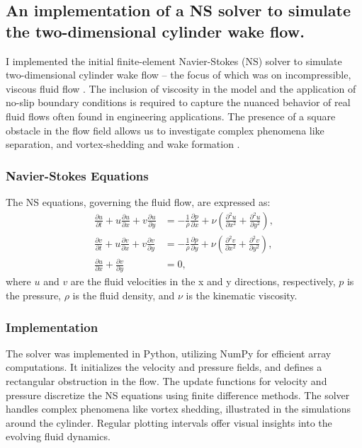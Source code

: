 \subsection{An implementation of a NS solver to simulate the two-dimensional cylinder wake flow.}

I implemented the initial finite-element Navier-Stokes (NS) solver \cite{Batchelor2000} to simulate two-dimensional cylinder wake flow -- the focus of which was on incompressible, viscous fluid flow \cite{Pope2000}. The inclusion of viscosity in the model and the application of no-slip boundary conditions \cite{White2006} is required to capture the nuanced behavior of real fluid flows often found in engineering applications. The presence of a square obstacle in the flow field allows us to investigate complex phenomena like separation, and vortex-shedding and wake formation \cite{Zdravkovich1997,Anderson1995}.

\subsubsection{Navier-Stokes Equations}
The NS equations, governing the fluid flow, are expressed as:
\begin{align}
    \frac{\partial u}{\partial t} + u \frac{\partial u}{\partial x} + v \frac{\partial u}{\partial y} &= -\frac{1}{\rho} \frac{\partial p}{\partial x} + \nu \left( \frac{\partial^2 u}{\partial x^2} + \frac{\partial^2 u}{\partial y^2} \right), \\
    \frac{\partial v}{\partial t} + u \frac{\partial v}{\partial x} + v \frac{\partial v}{\partial y} &= -\frac{1}{\rho} \frac{\partial p}{\partial y} + \nu \left( \frac{\partial^2 v}{\partial x^2} + \frac{\partial^2 v}{\partial y^2} \right), \\
    \frac{\partial u}{\partial x} + \frac{\partial v}{\partial y} &= 0,
\end{align}
where \( u \) and \( v \) are the fluid velocities in the x and y directions, respectively, \( p \) is the pressure, \( \rho \) is the fluid density, and \( \nu \) is the kinematic viscosity.

\subsubsection{Implementation}

The solver was implemented in Python, utilizing NumPy for efficient array computations. It initializes the velocity and pressure fields, and defines a rectangular obstruction in the flow. The update functions for velocity and pressure discretize the NS equations using finite difference methods. The solver handles complex phenomena like vortex shedding, illustrated in the simulations around the cylinder. Regular plotting intervals offer visual insights into the evolving fluid dynamics.

